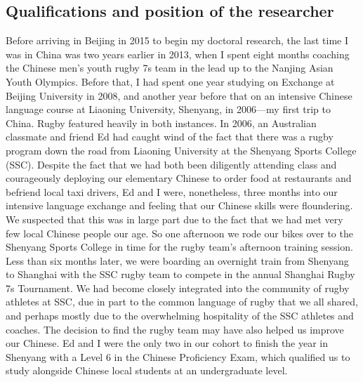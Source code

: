 \begin{CJK}{UTF8}{gbsn}
    \section{Qualifications and position of the researcher}

    Before arriving in Beijing in 2015 to begin my doctoral research, the last time I was in China was two years earlier in 2013, when I spent eight months coaching the Chinese men's youth rugby 7s team in the lead up to the Nanjing Asian Youth Olympics.  Before that, I had spent one year studying on Exchange at Beijing University in 2008, and another year before that on an intensive Chinese language course at Liaoning University, Shenyang, in 2006---my first trip to China.  Rugby featured heavily in both instances.  In 2006, an Australian classmate and friend Ed had caught wind of the fact that there was a rugby program down the road from Liaoning University at the Shenyang Sports College (SSC).  Despite the fact that we had both been diligently attending class and courageously deploying our elementary Chinese to order food at restaurants and befriend local taxi drivers, Ed and I were, nonetheless, three months into our intensive language exchange and feeling that our Chinese skills were floundering.  We suspected that this was in large part due to the fact that we had met very few local Chinese people our age.  So one afternoon we rode our bikes over to the Shenyang Sports College in time for the rugby team's afternoon training session.  Less than six months later, we were boarding an overnight train from Shenyang to Shanghai with the SSC rugby team to compete in the annual Shanghai Rugby 7s Tournament.  We had become closely integrated into the community of rugby athletes at SSC, due in part to the common language of rugby that we all shared, and perhaps mostly due to the overwhelming hospitality of the SSC athletes and coaches.  The decision to find the rugby team may have also helped us improve our Chinese. Ed and I were the only two in our cohort to finish the year in Shenyang with a Level 6 in the Chinese Proficiency Exam, which qualified us to study alongside Chinese local students at an undergraduate level.


\end{CJK}
